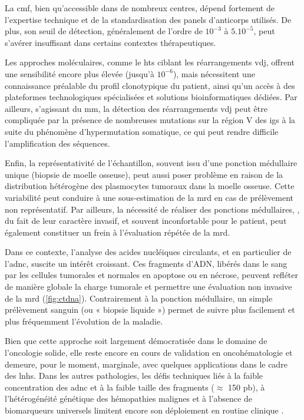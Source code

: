 La \gls{cmf}, bien qu'accessible dans de nombreux centres, dépend fortement de
l'expertise technique et de la standardisation des panels d'anticorps utilisés.
De plus, son seuil de détection, généralement de l'ordre de $10^{-3}$ à
$5.10^{-5}$, peut s'avérer insuffisant dans certains contextes thérapeutiques.

Les approches moléculaires, comme le \gls{hts} ciblant les réarrangements
\gls{vdj}, offrent une sensibilité encore plus élevée (jusqu'à $10^{-6}$), mais
nécessitent une connaissance préalable du profil clonotypique du patient, ainsi
qu'un accès à des plateformes technologiques spécialisées et solutions
bioinformatiques dédiées. Par ailleurs, s'agissant du \gls{mm}, la détection
des réarrangements \gls{vdj} peut être compliquée par la présence de nombreuses
mutations sur la région V des \glspl{ig} à la suite du phénomène
d'hypermutation somatique, ce qui peut rendre difficile l'amplification des
séquences.

Enfin, la représentativité de l'échantillon, souvent issu d'une ponction
médullaire unique (biopsie de moelle osseuse), peut aussi poser problème en
raison de la distribution hétérogène des plasmocytes tumoraux dans la moelle
osseuse. Cette variabilité peut conduire à une sous-estimation de la \gls{mrd}
en cas de prélèvement non représentatif. Par ailleurs, la nécessité de réaliser
des ponctions médullaires, , du fait de leur caractère invasif, et souvent
inconfortable pour le patient, peut également constituer un frein à
l'évaluation répétée de la \gls{mrd}.

Dans ce contexte, l'analyse des acides nucléiques circulants, et en particulier
de l'\gls{adnc}, suscite un intérêt croissant. Ces fragments d'ADN, libérés
dans le sang par les cellules tumorales et normales en apoptose ou en nécrose,
peuvent refléter de manière globale la charge tumorale et permettre une
évaluation non invasive de la \gls{mrd} (\autoref{fig:ctdna}). Contrairement à
la ponction médullaire, un simple prélèvement sanguin (ou « biopsie liquide »)
permet de suivre plus facilement et plus fréquemment l'évolution de la maladie.

Bien que cette approche soit largement démocratisée dans le domaine de
l'oncologie solide, elle reste encore en cours de validation en oncohématologie
et demeure, pour le moment, marginale, avec quelques applications dans le cadre
des \glspl{lnh}. Dans les autres pathologies, les défis techniques liés à la
faible concentration des \gls{adnc} et à la faible taille des fragments
($\approx$ 150 pb), à l'hétérogénéité génétique des hémopathies malignes et à
l'absence de biomarqueurs universels limitent encore son déploiement en routine
clinique \cite{daoUsingCfDNACtDNA2023}.

